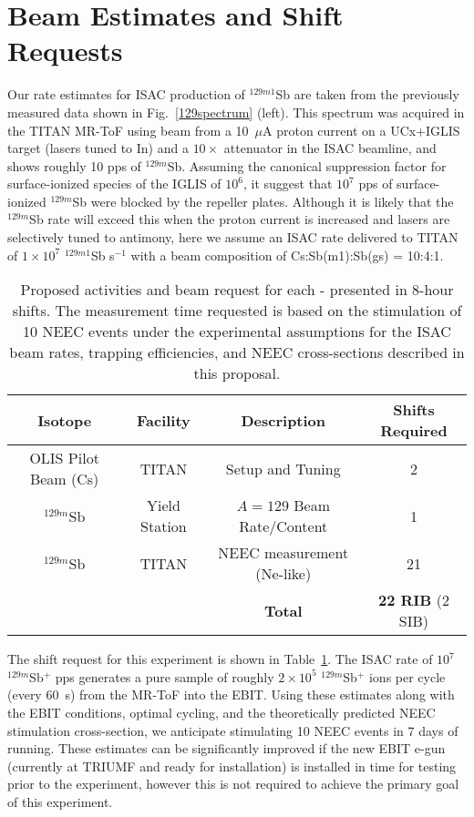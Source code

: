 \documentclass[12pt]{article}
\begin{document}
\section{Beam Estimates and Shift Requests}
Our rate estimates for ISAC production of $^{129m1}$Sb are taken from the previously measured data shown in Fig.~\ref{129spectrum} (left).  This spectrum was acquired in the TITAN MR-ToF using beam from a 10~$\mu$A proton current on a UCx+IGLIS target (lasers tuned to In) and a $10\times$ attenuator in the ISAC beamline, and shows roughly 10 pps of $^{129m}$Sb.  Assuming the canonical suppression factor for surface-ionized species of the IGLIS of $10^6$, it suggest that $10^7$ pps of surface-ionized $^{129m}$Sb were blocked by the repeller plates.  Although it is likely that the $^{129m}$Sb rate will exceed this when the proton current is increased and lasers are selectively tuned to antimony, here we assume an ISAC rate delivered to TITAN of $1\times10^7$ $^{129m1}$Sb s$^{-1}$ with a beam composition of Cs:Sb(m1):Sb(gs) = 10:4:1.

\begin{table}[t!]
\caption{\label{tab:beamtime}Proposed activities and beam request for each - presented in 8-hour shifts.  The measurement time requested is based on the stimulation of 10 NEEC events under the experimental assumptions for the ISAC beam rates, trapping efficiencies, and NEEC cross-sections described in this proposal.}
\begin{center}
\begin{tabular}{cccc}
\hline
\hline
Isotope & Facility & Description & Shifts Required\\
\hline
OLIS Pilot Beam (Cs) & TITAN & Setup and Tuning & 2 \\
$^{129m}$Sb & Yield Station & $A=129$ Beam Rate/Content & 1 \\
$^{129m}$Sb & TITAN & NEEC measurement (Ne-like) & 21 \\
\hline
 & & \hfill{\bf Total} & {\bf 22 RIB } (2 SIB)\\
\end{tabular}
\end{center}
\end{table}

The shift request for this experiment is shown in Table~\ref{tab:beamtime}.  The ISAC rate of $10^7$ $^{129m}$Sb$^+$ pps generates a pure sample of roughly $2\times10^5$ $^{129m}$Sb$^+$ ions per cycle (every 60~s) from the MR-ToF into the EBIT.  Using these estimates along with the EBIT conditions, optimal cycling, and the theoretically predicted NEEC stimulation cross-section, we anticipate stimulating 10 NEEC events in 7 days of running.  These estimates can be significantly improved if the new EBIT e-gun (currently at TRIUMF and ready for installation) is installed in time for testing prior to the experiment, however this is not required to achieve the primary goal of this experiment.
\end{document}

